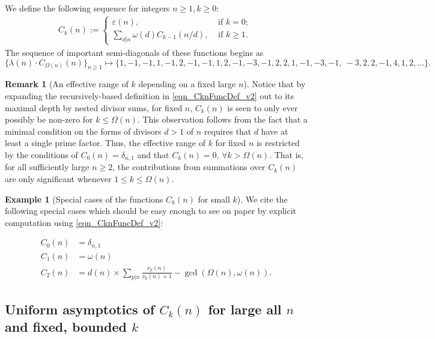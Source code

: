 \documentclass[11pt,reqno,a4letter]{article}
\numberwithin{figure}{section}
\numberwithin{table}{section}
\newcommand{\seqnum}[1]{\href{http://oeis.org/#1}{\color{ProcessBlue}{\underline{#1}}}}
\theoremstyle{plain}
\numberwithin{theorem}{section}
\theoremstyle{definition}
\newtheorem{example}[theorem]{Example}
\newtheorem{remark}[theorem]{Remark}
\newcommand{\NBRef}[1]{}
\begin{document}
We define the following sequence for integers $n \geq 1, k \geq 0$: 
\begin{align} 
\label{eqn_CknFuncDef_v2} 
C_k(n) := \begin{cases} 
     \varepsilon(n), & \text{ if $k = 0$; } \\ 
     \sum\limits_{d|n} \omega(d) C_{k-1}(n/d), & \text{ if $k \geq 1$. } 
     \end{cases} 
\end{align} 
The sequence of important semi-diagonals of these functions begins as 
\cite[\seqnum{A008480}]{OEIS} 
\[
\{\lambda(n) \cdot C_{\Omega(n)}(n) \}_{n \geq 1} \mapsto \{
     1, -1, -1, 1, -1, 2, -1, -1, 1, 2, -1, -3, -1, 2, 2, 1, -1, -3, -1, \
     -3, 2, 2, -1, 4, 1, 2, \ldots \}. 
\]

\begin{remark}[An effective range of $k$ depending on a fixed large $n$]
Notice that by expanding the recursively-based definition in \eqref{eqn_CknFuncDef_v2} 
out to its maximal depth by nested divisor sums, for fixed $n$, $C_k(n)$ is seen to 
only ever possibly be non-zero for $k \leq \Omega(n)$. 
This observation follows from the fact that 
a minimal condition on the forms of 
divisors $d > 1$ of $n$ requires that $d$ have at least a single prime factor. 
Thus, the effective range of $k$ for fixed $n$ is restricted by the 
conditions of $C_0(n) = \delta_{n,1}$ and that $C_k(n) = 0$, $\forall k > \Omega(n)$. 
That is, for all sufficiently large $n \geq 2$, the contributions from 
summations over $C_k(n)$ are only significant whenever $1 \leq k \leq \Omega(n)$. 
\end{remark} 

\begin{example}[Special cases of the functions $C_k(n)$ for small $k$] 
\label{example_SpCase_Ckn} 
We cite the following special cases which should be easy enough to see on paper by 
explicit computation using \eqref{eqn_CknFuncDef_v2}: 
\NBRef{A07-2020-04-26} 
\begin{align*} 
C_0(n) & = \delta_{n,1} \\ 
C_1(n) & = \omega(n) \\ 
C_2(n) & = d(n) \times \sum_{p|n} \frac{\nu_p(n)}{\nu_p(n)+1} - \gcd\left(\Omega(n), \omega(n)\right). 
\end{align*} 
\end{example} 

\subsection{Uniform asymptotics of $C_k(n)$ for large all $n$ and fixed, bounded $k$} 
\end{document}
